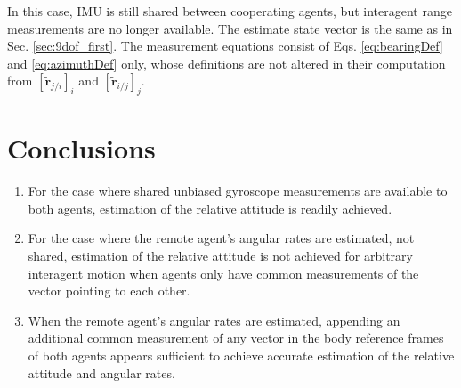 \documentclass{aiaa-tc}
\newcommand{\br}[2]{[#1]_{#2}} %
\newcommand{\B}[1]{\textbf{#1}} %
\begin{document}
In this case, IMU is still shared between cooperating agents, but interagent range measurements are no longer available. The estimate state vector is the same as in Sec. \ref{sec:9dof_first}. The measurement equations consist of Eqs. \ref{eq:bearingDef} and \ref{eq:azimuthDef} only, whose definitions are not altered in their computation from $\br{\tilde{\B{r}}_{j/i}}{i}$ and $\br{\tilde{\B{r}}_{i/j}}{j}$.

\section{Conclusions}

\begin{enumerate}
\item For the case where shared unbiased gyroscope measurements are available to both agents, estimation of the relative attitude is readily achieved.
\item For the case where the remote agent's angular rates are estimated, not shared, estimation of the relative attitude is not achieved for arbitrary interagent motion when agents only have common measurements of the vector pointing to each other.
\item When the remote agent's angular rates are estimated, appending an additional common measurement of any vector in the body reference frames of both agents appears sufficient to achieve accurate estimation of the relative attitude and angular rates.
\end{enumerate}

%

%
\end{document}
